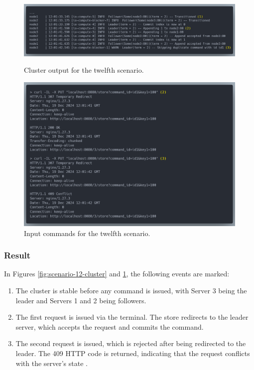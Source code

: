 \begin{figure}[!ht]
\centering
\includegraphics[width=500pt]{images/scenario_12_cluster.png}
\caption{Cluster output for the twelfth scenario.}
\label{fig:scenario-12-cluster}
\includegraphics[width=500pt]{images/scenario_12_commands.png}
\caption{Input commands for the twelfth scenario.}
\label{fig:scenario-12-commands}
\end{figure}

\subsubsection{Result}
In Figures \ref{fig:scenario-12-cluster} and \ref{fig:scenario-12-commands}, the following events are marked:
\begin{enumerate}
    \item The cluster is stable before any command is issued, with Server 3 being the leader and Servers 1 and 2 being followers.
    \item The first request is issued via the terminal. The store redirects to the leader server, which accepts the request and commits the command.
    \item The second request is issued, which is rejected after being redirected to the leader. The 409 HTTP code is returned, indicating that the request conflicts with the server's state \cite{409-status-code}.
\end{enumerate}
